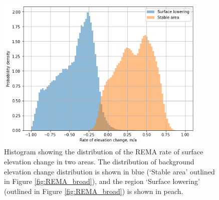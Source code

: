 \begin{figure}[!ht]
\centering
\includegraphics[width=0.9\textwidth]{chapters/2/REMA_histogram.png}
\caption[REMA difference distribution]{Histogram showing the distribution of the REMA rate of surface elevation change in two areas. The distribution of background elevation change distribution is shown in blue (`Stable area' outlined in Figure \ref{fig:REMA_broad}), and the region `Surface lowering' (outlined in Figure \ref{fig:REMA_broad}) is shown in peach.}
\label{fig:REMA_histogram}
\end{figure}

